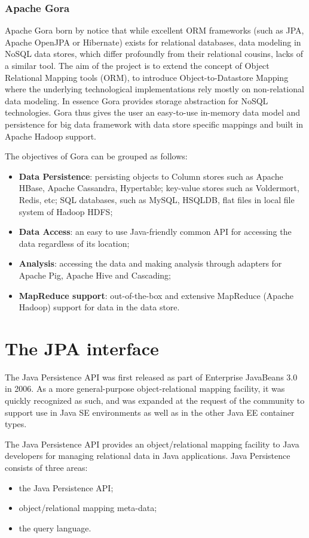 \subsubsection{Apache Gora}
Apache Gora \cite{online:apache-gora} born by notice that while excellent ORM frameworks (such as JPA, Apache OpenJPA or Hibernate) exists for relational databases, data modeling in NoSQL data stores, which differ profoundly from their relational cousins, lacks of a similar tool. The aim of the project is to extend the concept of Object Relational Mapping tools (ORM), to introduce Object-to-Datastore Mapping where the underlying technological implementations rely mostly on non-relational data modeling. In essence Gora provides storage abstraction for NoSQL technologies. 
Gora thus gives the user an easy-to-use in-memory data model and persistence for big data framework with data store specific mappings and built in Apache Hadoop support.

\newparagraph The objectives of Gora can be grouped as follows:
\begin{itemize}
\item \textbf{Data Persistence}: persisting objects to Column stores such as Apache HBase, Apache Cassandra, Hypertable; key-value stores such as Voldermort, Redis, etc; SQL databases, such as MySQL, HSQLDB, flat files in local file system of Hadoop HDFS; 
\item \textbf{Data Access}: an easy to use Java-friendly common API for accessing the data regardless of its location; 
\item \textbf{Analysis}: accessing the data and making analysis through adapters for Apache Pig, Apache Hive and Cascading;
\item \textbf{MapReduce support}: out-of-the-box and extensive MapReduce (Apache Hadoop) support for data in the data store.
\end{itemize}

\section{The JPA interface}
\label{sec:jpa}
The Java Persistence API \cite{book:projpa2} was first released as part of Enterprise JavaBeans 3.0 in 2006. As a more general-purpose object-relational mapping facility, it was quickly recognized as such, and was expanded at the request of the community to support use in Java SE environments as well as in the other Java EE container types.

\newparagraph The Java Persistence API provides an object/relational mapping facility to Java developers for managing relational data in Java applications. Java Persistence consists of three areas:
\begin{itemize}
\item the Java Persistence API;
\item object/relational mapping meta-data;
\item the query language.
\end{itemize}

